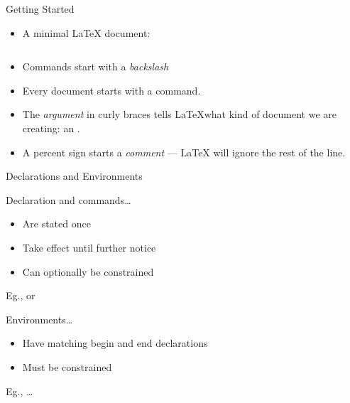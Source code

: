 \documentclass[10pt,times]{beamer}
\begin{document}
\begin{frame}[fragile]{Getting Started}
\begin{itemize}
\item A minimal \LaTeX{} document:
\inputminted[frame=single]{latex}{Hello.tex}
\item Commands start with a \emph{backslash} \keys{$\backslash$}
\item Every document starts with a  command.
\item The \emph{argument} in curly braces \keys{\{} \keys{\}} 
tells \LaTeX what kind of document we are creating: an .
\item A percent sign \keys{\%} starts a \emph{comment} --- \LaTeX
will ignore the rest of the line.

\end{itemize}
\end{frame}

\begin{frame}{Declarations and Environments}
\begin{block}{Declaration and commands\ldots}
\begin{itemize}
\item Are stated once
\item Take effect until further notice
\item Can optionally be constrained
\end{itemize}
Eg.,  or 
\end{block}

\begin{block}{Environments\ldots}
\begin{itemize}
\item Have matching begin and end declarations
\item Must be constrained
\end{itemize}
Eg.,  \ldots {}
\end{block}
\end{frame}
\end{document}
